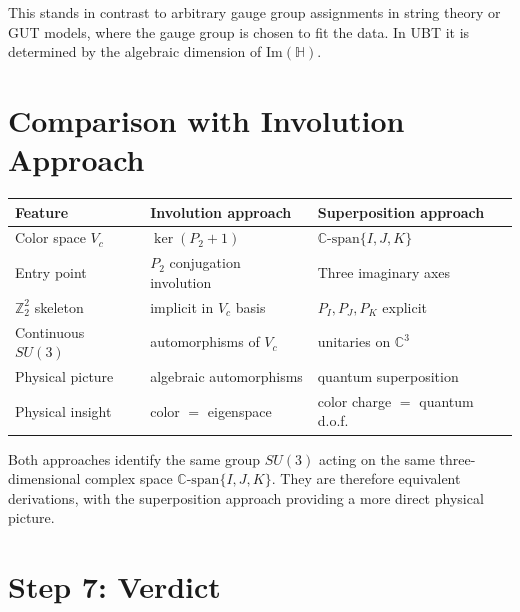 \documentclass[12pt,a4paper]{article}
\theoremstyle{definition}
\theoremstyle{remark}
\begin{document}
This stands in contrast to arbitrary gauge group assignments in
string theory or GUT models, where the gauge group is chosen to fit the
data.  In UBT it is determined by the algebraic dimension of $\mathrm{Im}(\mathbb{H})$.

\section{Comparison with Involution Approach}
\label{sec:comparison}

\begin{center}
\begin{tabular}{lll}
\toprule
\textbf{Feature} & \textbf{Involution approach} & \textbf{Superposition approach} \\
\midrule
Color space $V_c$ & $\ker(P_2+1)$ & $\mathbb{C}\text{-span}\{I,J,K\}$ \\
Entry point & $P_2$ conjugation involution & Three imaginary axes \\
$\mathbb{Z}_2^2$ skeleton & implicit in $V_c$ basis & $P_I, P_J, P_K$ explicit \\
Continuous $SU(3)$ & automorphisms of $V_c$ & unitaries on $\mathbb{C}^3$ \\
Physical picture & algebraic automorphisms & quantum superposition \\
Physical insight & color $=$ eigenspace & color charge $=$ quantum d.o.f. \\
\bottomrule
\end{tabular}
\end{center}

Both approaches identify the same group $SU(3)$ acting on the same
three-dimensional complex space $\mathbb{C}\text{-span}\{I,J,K\}$.  They
are therefore equivalent derivations, with the superposition approach
providing a more direct physical picture.

\section{Step 7: Verdict}
\label{sec:verdict}
\end{document}
